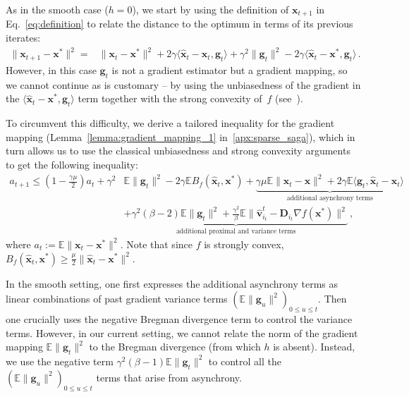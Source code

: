 \documentclass{article}
\def\EE{{\mathbb E}}
\def\xx{{\boldsymbol x}}
\def\vv{{\boldsymbol v}}
\def\DD{{\boldsymbol D}}
\begin{document}
As in the smooth case ($h=0$), we start by using the definition of $\xx_{t+1}$  in Eq.~\eqref{eq:definition} to relate the distance to the optimum in terms of its previous iterates:
\begin{equation}
\begin{aligned}
\|\xx_{t+1} - \xx^*\|^2 = &\|\xx_{t} - \xx^*\|^2  + 2 \gamma \langle \hat \xx_t - \xx_t, \boldsymbol g_t \rangle +\gamma^2 \|\boldsymbol g_t\|^2 - 2 \gamma \langle \hat \xx_t - \xx^*, \boldsymbol g_t\rangle \,  .
\end{aligned}
\end{equation}
However, in this case $\boldsymbol g_t$ is not a gradient estimator but a gradient mapping, so we cannot continue as is customary -- by using the unbiasedness of the gradient in the $\langle\hat \xx_t - \xx^*, \boldsymbol g_t\rangle$ term together with the strong convexity of~$f$ (see~\citet[Section 3.5]{leblond2016Asaga}).

To circumvent this difficulty, we derive a tailored inequality for the gradient mapping (Lemma~\ref{lemma:gradient_mapping_1} in~\ref{apx:sparse_saga}), which in turn allows us to use the classical unbiasedness and strong convexity arguments to get the following inequality:
\begin{align}
a_{t+1}
\leq (1 - \frac{\gamma \mu}{2}) a_t + \gamma^2 &\EE \|\boldsymbol g_t\|^2 - 2 \gamma \EE B_f(\hat{\xx}_t, \xx^*) +
\underbrace{ \gamma \mu \EE \|\hat{\xx}_t - \xx\|^2 +2 \gamma \EE \langle \boldsymbol g_t,  \hat{\xx}_t - \xx_t \rangle}_{\text{additional asynchrony terms}} \\
&\underbrace{+ \gamma^2(\beta - 2) \EE \|\boldsymbol g_t\|^2 + \frac{\gamma^2}{\beta} \EE \|\hat \vv^t_{i_t} - \DD_{i_t} \nabla f(\xx^*)\|^2}_{\text{additional proximal and variance terms}} \,, \nonumber
\end{align}
where $a_t := \EE \|\xx_t - \xx^*\|^2$.
Note that since $f$ is strongly convex, $B_f(\hat{\xx}_t, \xx^*) \geq \frac{\mu}{2}\|\hat \xx_t - \xx^*\|^2 $.

In the smooth setting, one first expresses the additional asynchrony terms as linear combinations of past gradient variance terms $(\EE \|\boldsymbol g_u\|^2)_{0 \leq u \leq t}$.
Then one crucially uses the negative Bregman divergence term to control the variance terms. However, in our current setting, we cannot relate the norm of the gradient mapping $\EE \|\boldsymbol g_t\|^2$ to the Bregman divergence (from which $h$ is absent).
Instead, we use the negative term $\gamma^2(\beta - 1)\EE\|\boldsymbol g_t\|^2$ to control all the $(\EE \|\boldsymbol g_u\|^2)_{0 \leq u \leq t}$ terms that arise from asynchrony.
%
\end{document}
